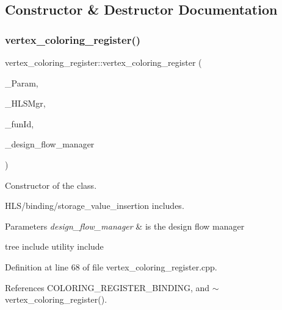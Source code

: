 \subsection{Constructor \& Destructor Documentation}
\mbox{\label{classvertex__coloring__register_a36703a7515462e2608596f8f0dc9d0d1}} 
\subsubsection{\texorpdfstring{vertex\+\_\+coloring\+\_\+register()}{vertex\_coloring\_register()}}
{\footnotesize\ttfamily vertex\+\_\+coloring\+\_\+register\+::vertex\+\_\+coloring\+\_\+register (\begin{DoxyParamCaption}\item[{const \hyperlink{Parameter_8hpp_a37841774a6fcb479b597fdf8955eb4ea}{Parameter\+Const\+Ref}}]{\+\_\+\+Param,  }\item[{const \hyperlink{hls__manager_8hpp_acd3842b8589fe52c08fc0b2fcc813bfe}{H\+L\+S\+\_\+manager\+Ref}}]{\+\_\+\+H\+L\+S\+Mgr,  }\item[{unsigned int}]{\+\_\+fun\+Id,  }\item[{const Design\+Flow\+Manager\+Const\+Ref}]{\+\_\+design\+\_\+flow\+\_\+manager }\end{DoxyParamCaption})}



Constructor of the class. 

H\+L\+S/binding/storage\+\_\+value\+\_\+insertion includes.


\begin{DoxyParams}{Parameters}
{\em design\+\_\+flow\+\_\+manager} & is the design flow manager\\
\hline
\end{DoxyParams}
tree include utility include 

Definition at line 68 of file vertex\+\_\+coloring\+\_\+register.\+cpp.



References C\+O\+L\+O\+R\+I\+N\+G\+\_\+\+R\+E\+G\+I\+S\+T\+E\+R\+\_\+\+B\+I\+N\+D\+I\+NG, and $\sim$vertex\+\_\+coloring\+\_\+register().

